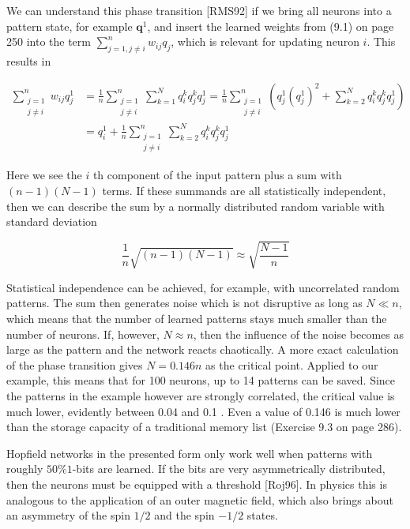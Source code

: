 \documentclass[10pt]{book}
\begin{document}
\begin{center}
\begin{enumerate}
\begin{center}
\begin{center}
\begin{center}
We can understand this phase transition [RMS92] if we bring all neurons into a pattern state, for example $\boldsymbol{q}^{1}$, and insert the learned weights from (9.1) on page 250 into the term $\sum_{j=1, j \neq i}^{n} w_{i j} q_{j}$, which is relevant for updating neuron $i$. This results in

$$
\begin{aligned}
\sum_{\substack{j=1 \\
j \neq i}}^{n} w_{i j} q_{j}^{1} & =\frac{1}{n} \sum_{\substack{j=1 \\
j \neq i}}^{n} \sum_{k=1}^{N} q_{i}^{k} q_{j}^{k} q_{j}^{1}=\frac{1}{n} \sum_{\substack{j=1 \\
j \neq i}}^{n}\left(q_{j}^{1}\left(q_{j}^{1}\right)^{2}+\sum_{k=2}^{N} q_{i}^{k} q_{j}^{k} q_{j}^{1}\right) \\
& =q_{i}^{1}+\frac{1}{n} \sum_{\substack{j=1 \\
j \neq i}}^{n} \sum_{k=2}^{N} q_{i}^{k} q_{j}^{k} q_{j}^{1}
\end{aligned}
$$

Here we see the $i$ th component of the input pattern plus a sum with $(n-1)(N-1)$ terms. If these summands are all statistically independent, then we can describe the sum by a normally distributed random variable with standard deviation


$$
\frac{1}{n} \sqrt{(n-1)(N-1)} \approx \sqrt{\frac{N-1}{n}}
$$

Statistical independence can be achieved, for example, with uncorrelated random patterns. The sum then generates noise which is not disruptive as long as $N \ll n$, which means that the number of learned patterns stays much smaller than the number of neurons. If, however, $N \approx n$, then the influence of the noise becomes as large as the pattern and the network reacts chaotically. A more exact calculation of the phase transition gives $N=0.146 n$ as the critical point. Applied to our example, this means that for 100 neurons, up to 14 patterns can be saved. Since the patterns in the example however are strongly correlated, the critical value is much lower, evidently between 0.04 and 0.1 . Even a value of 0.146 is much lower than the storage capacity of a traditional memory list (Exercise 9.3 on page 286).

Hopfield networks in the presented form only work well when patterns with roughly $50 \% 1$-bits are learned. If the bits are very asymmetrically distributed, then the neurons must be equipped with a threshold [Roj96]. In physics this is analogous to the application of an outer magnetic field, which also brings about an asymmetry of the spin $1 / 2$ and the spin $-1 / 2$ states.


\end{center}
\end{center}
\end{center}
\end{enumerate}
\end{center}
\end{document}
